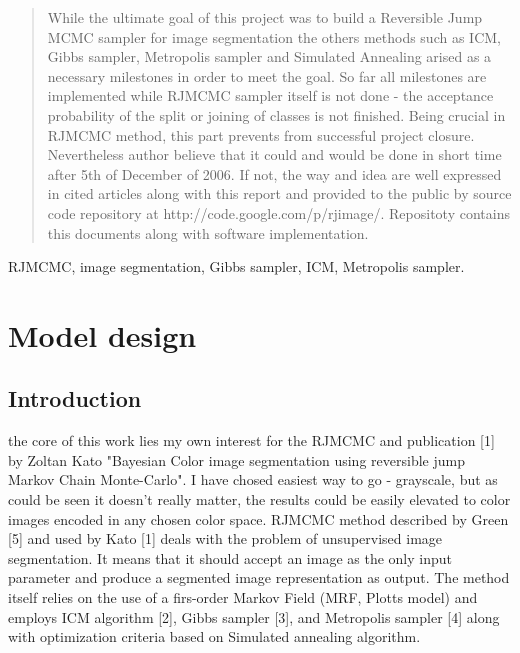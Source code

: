 \documentclass[journal]{IEEEtran}
\begin{document}
\maketitle


\begin{abstract}
While the ultimate goal of this project was to build a Reversible Jump MCMC sampler for image segmentation the others methods such as ICM, Gibbs sampler, Metropolis sampler and Simulated Annealing arised as a necessary milestones in order to meet the goal. So far all milestones are implemented while RJMCMC sampler itself is not done - the acceptance probability of the split or joining of classes is not finished. Being crucial in RJMCMC method, this part prevents from successful project closure. Nevertheless author believe that it could and would be done in short time after 5th of December of 2006. If not, the way and idea are well expressed in cited articles along with this report and provided to the public by source code repository at http://code.google.com/p/rjimage/. Repositoty contains this documents along with software implementation.
\end{abstract}

\begin{keywords}
RJMCMC, image segmentation, Gibbs sampler, ICM, Metropolis sampler.
\end{keywords}

%


\section{Model design}
\subsection{Introduction}
 the core of this work lies my own interest for the RJMCMC and publication [1] by Zoltan Kato "Bayesian Color image segmentation using reversible jump Markov Chain Monte-Carlo". I have chosed easiest way to go - grayscale, but as could be seen it doesn't really matter, the results could be easily elevated to color images encoded in any chosen color space. RJMCMC method described by Green [5] and used by Kato [1] deals with the problem of unsupervised image segmentation. It means that it should accept an image as the only input parameter and produce a segmented image representation as output. The method itself relies on the use of a firs-order Markov Field (MRF, Plotts model) and employs ICM algorithm [2], Gibbs sampler [3], and Metropolis sampler [4] along with optimization criteria based on Simulated annealing algorithm.
\end{document}
